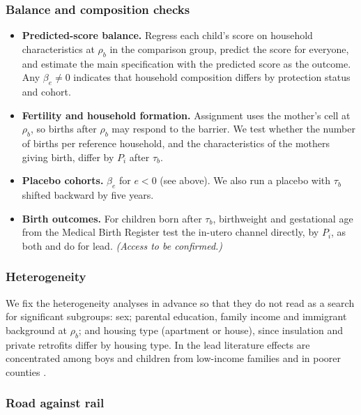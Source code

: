 \documentclass[11pt]{article}
\begin{document}
\subsubsection{Balance and composition checks}

\begin{itemize}
\item \textbf{Predicted-score balance.} Regress each child's score on household characteristics at \(\rho_b\) in the comparison group, predict the score for everyone, and estimate the main specification with the predicted score as the outcome. Any \(\beta_e \neq 0\) indicates that household composition differs by protection status and cohort.
\item \textbf{Fertility and household formation.} Assignment uses the mother's cell at \(\rho_b\), so births after \(\rho_b\) may respond to the barrier. We test whether the number of births per reference household, and the characteristics of the mothers giving birth, differ by \(P_i\) after \(\tau_b\).
\item \textbf{Placebo cohorts.} \(\beta_e\) for \(e<0\) (see above). We also run a placebo with \(\tau_b\) shifted backward by five years.
\item \textbf{Birth outcomes.} For children born after \(\tau_b\), birthweight and gestational age from the Medical Birth Register test the in-utero channel directly, by \(P_i\), as both \textcite{gronqvistUnderstandingHowLow2020} and \textcite{berkhoutLeadExposureCognitive2025} do for lead. \emph{(Access to be confirmed.)}
\end{itemize}

\subsubsection{Heterogeneity}

We fix the heterogeneity analyses in advance so that they do not read as a search for significant subgroups: sex; parental education, family income and immigrant background at \(\rho_b\); and housing type (apartment or house), since insulation and private retrofits differ by housing type. In the lead literature effects are concentrated among boys and children from low-income families \autocite{gronqvistUnderstandingHowLow2020} and in poorer counties \autocite{hollingsworthThousandCutsCumulative2025}.

\subsubsection{Road against rail}
\end{document}
